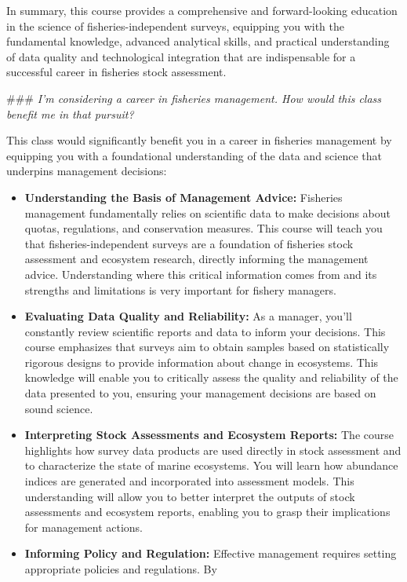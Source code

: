 \documentclass[
  letterpaper,
  oneside,
  open=any]{scrbook}
\providecommand{\tightlist}{%
  \setlength{\itemsep}{0pt}\setlength{\parskip}{0pt}}\usepackage{longtable,booktabs,array}
\begin{document}
In summary, this course provides a comprehensive and forward-looking
education in the science of fisheries-independent surveys, equipping you
with the fundamental knowledge, advanced analytical skills, and
practical understanding of data quality and technological integration
that are indispensable for a successful career in fisheries stock
assessment.

\#\#\# \emph{I'm considering a career in fisheries management. How would
this class benefit me in that pursuit?}

This class would significantly benefit you in a career in fisheries
management by equipping you with a foundational understanding of the
data and science that underpins management decisions:

\begin{itemize}
\tightlist
\item
  \textbf{Understanding the Basis of Management Advice:} Fisheries
  management fundamentally relies on scientific data to make decisions
  about quotas, regulations, and conservation measures. This course will
  teach you that fisheries-independent surveys are a foundation of
  fisheries stock assessment and ecosystem research, directly informing
  the management advice. Understanding where this critical information
  comes from and its strengths and limitations is very important for
  fishery managers.
\item
  \textbf{Evaluating Data Quality and Reliability:} As a manager, you'll
  constantly review scientific reports and data to inform your
  decisions. This course emphasizes that surveys aim to obtain samples
  based on statistically rigorous designs to provide information about
  change in ecosystems. This knowledge will enable you to critically
  assess the quality and reliability of the data presented to you,
  ensuring your management decisions are based on sound science.
\item
  \textbf{Interpreting Stock Assessments and Ecosystem Reports:} The
  course highlights how survey data products are used directly in stock
  assessment and to characterize the state of marine ecosystems. You
  will learn how abundance indices are generated and incorporated into
  assessment models. This understanding will allow you to better
  interpret the outputs of stock assessments and ecosystem reports,
  enabling you to grasp their implications for management actions.
\item
  \textbf{Informing Policy and Regulation:} Effective management
  requires setting appropriate policies and regulations. By

\end{itemize}
\end{document}
